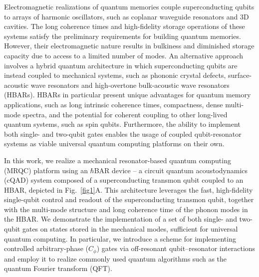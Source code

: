 \documentclass[12pt]{article}
\begin{document}
Electromagnetic realizations of quantum memories couple superconducting qubits to arrays of harmonic oscillators, such as coplanar waveguide resonators\cite{naik2017random, mariantoni2011implementing} and 3D cavities\cite{milul2023superconducting, li2025cascaded}. The long coherence times and high-fidelity storage operations of these systems satisfy the preliminary requirements for building quantum memories. However, their electromagnetic nature results in bulkiness and diminished storage capacity due to access to a limited number of modes. An alternative approach involves a hybrid quantum architecture\cite{pechal2018superconducting, chu2020perspective} in which superconducting qubits are instead coupled to mechanical systems, such as phononic crystal defects\cite{wollack2022quantum}, surface-acoustic wave resonators\cite{satzinger2018quantum} and high-overtone bulk-acoustic wave resonators (HBARs)\cite{chu2017quantum}. HBARs in particular present unique advantages for quantum memory applications, such as long intrinsic coherence times\cite{luo2025lifetime}, compactness, dense multi-mode spectra, and the potential for coherent coupling to other long-lived quantum systems, such as spin qubits\cite{ovartchaiyapong2014dynamic, barfuss2015strong}. Furthermore,
the ability to implement both single- and two-qubit gates enables the usage of coupled qubit-resonator systems as viable universal quantum computing platforms on their own\cite{pechal2018superconducting, mariantoni2011implementing}.

In this work, we realize a mechanical resonator-based quantum computing (MRQC) platform  using an $\hbar$BAR device -- a circuit quantum acoustodynamics (cQAD) system composed of a superconducting transmon qubit coupled to an HBAR, depicted in Fig.~\ref{fig1}A. This architecture leverages the fast, high-fidelity single-qubit control and readout of the superconducting transmon qubit, together with the multi-mode structure and long coherence time of the phonon modes in the HBAR. We demonstrate the implementation of a set of both single- and two-qubit gates on states stored in the mechanical modes, sufficient for universal quantum computing. In particular, we introduce a scheme for implementing controlled arbitrary-phase ($C_{\phi}$) gates via off-resonant qubit–resonator interactions and employ it to realize commonly used quantum algorithms such as the quantum Fourier transform (QFT)\cite{nielsen2010quantum}.
\end{document}
